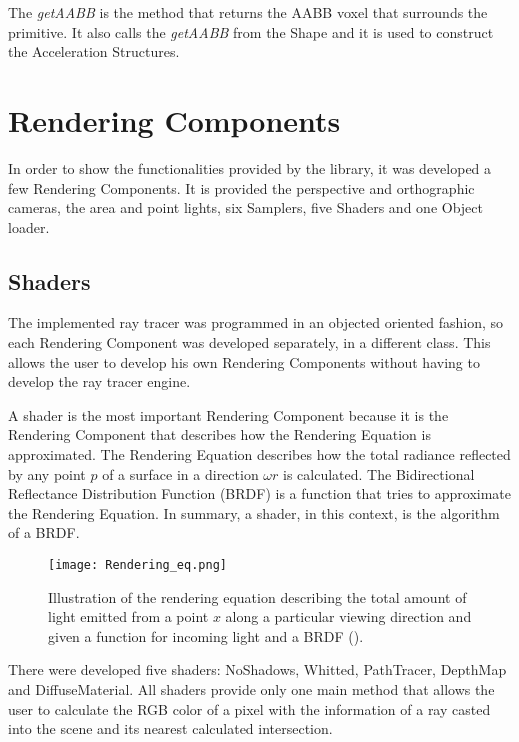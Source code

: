 \par
The \textit{getAABB} is the method that returns the AABB voxel that surrounds the primitive.
It also calls the \textit{getAABB} from the Shape and it is used to construct the Acceleration Structures.


\section{Rendering Components}

\par
In order to show the functionalities provided by the library, it was developed a few Rendering Components.
It is provided the perspective and orthographic cameras, the area and point lights, six Samplers, five Shaders and one Object loader.

\subsection{Shaders}

\par
The implemented ray tracer was programmed in an objected oriented fashion, so each Rendering Component was developed separately, in a different class.
This allows the user to develop his own Rendering Components without having to develop the ray tracer engine.

\par
A shader is the most important Rendering Component because it is the Rendering Component that describes how the Rendering Equation is approximated.
The Rendering Equation describes how the total radiance reflected by any point
$p$
of a surface in a direction
$\omega$$r$
is calculated.
The Bidirectional Reflectance Distribution Function (BRDF) is a function that tries to approximate the Rendering Equation.
In summary, a shader, in this context, is the algorithm of a BRDF.

\begin{figure}[H]
	\centering
	\caption{Illustration of the rendering equation describing the total amount of light emitted from a point
	$x$
	along a particular viewing direction and given a function for incoming light and a BRDF (\cite{RenderingEquation}).}
	\label{Rendering_Equation.}
	\texttt{[image: Rendering\_eq.png]}
\end{figure}

\par
There were developed five shaders: NoShadows, Whitted, PathTracer, DepthMap and DiffuseMaterial.
All shaders provide only one main method that allows the user to calculate the RGB color of a pixel with the information of a ray casted into the scene and its nearest calculated intersection.

